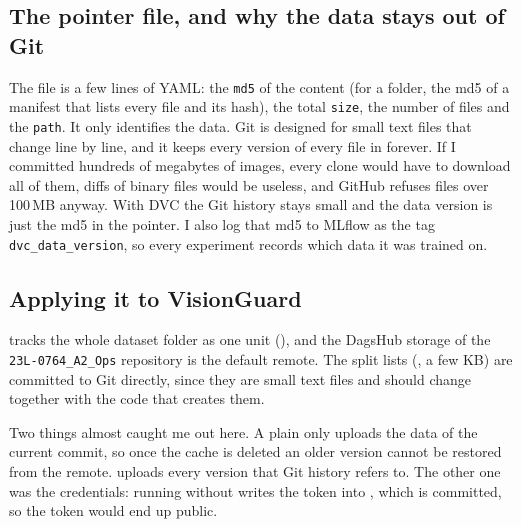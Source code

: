 \subsection*{The pointer file, and why the data stays out of Git}
The  file is a few lines of YAML: the \texttt{md5} of the content (for a folder, the
md5 of a manifest that lists every file and its hash), the total \texttt{size}, the number of
files and the \texttt{path}. It only identifies the data. Git is designed for small text files that
change line by line, and it keeps every version of every file in  forever. If I
committed hundreds of megabytes of images, every clone would have to download all of them, diffs
of binary files would be useless, and GitHub refuses files over 100\,MB anyway. With DVC the Git
history stays small and the data version is just the md5 in the pointer. I also log that md5 to
MLflow as the tag \texttt{dvc\_data\_version}, so every experiment records which data it was
trained on.

\subsection*{Applying it to VisionGuard}
 tracks the whole dataset folder as one unit (), and the
DagsHub storage of the \texttt{23L-0764\_A2\_Ops} repository is the default remote. The split lists
(, a few KB) are committed to Git directly, since they are small text files
and should change together with the code that creates them.


Two things almost caught me out here. A plain  only uploads the data of the current
commit, so once the cache is deleted an older version cannot be restored from the remote.
 uploads every version that Git history refers to. The other one was
the credentials: running  without  writes the token into
, which is committed, so the token would end up public.
